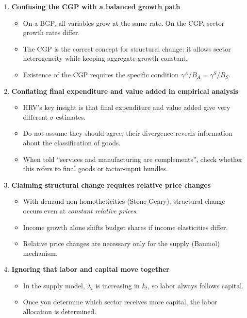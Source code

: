 \documentclass[a4paper,11pt]{article}
\begin{document}
\begin{enumerate}
    \item \textbf{Confusing the CGP with a balanced growth path}
    \begin{itemize}
        \item On a BGP, all variables grow at the same rate. On the CGP, sector growth rates differ.
        \item The CGP is the correct concept for structural change: it allows sector heterogeneity while keeping aggregate growth constant.
        \item Existence of the CGP requires the specific condition $\gamma^A / B_A = \gamma^S / B_S$.
    \end{itemize}

    \item \textbf{Conflating final expenditure and value added in empirical analysis}
    \begin{itemize}
        \item HRV's key insight is that final expenditure and value added give very different $\sigma$ estimates.
        \item Do not assume they should agree; their divergence reveals information about the classification of goods.
        \item When told ``services and manufacturing are complements'', check whether this refers to final goods or factor-input bundles.
    \end{itemize}

    \item \textbf{Claiming structural change requires relative price changes}
    \begin{itemize}
        \item With demand non-homotheticities (Stone-Geary), structural change occurs even at \emph{constant relative prices}.
        \item Income growth alone shifts budget shares if income elasticities differ.
        \item Relative price changes are necessary only for the supply (Baumol) mechanism.
    \end{itemize}

    \item \textbf{Ignoring that labor and capital move together}
    \begin{itemize}
        \item In the supply model, $\lambda_t$ is increasing in $k_t$, so labor always follows capital.
        \item Once you determine which sector receives more capital, the labor allocation is determined.
    \end{itemize}

\end{enumerate}
\end{document}
